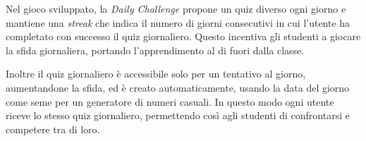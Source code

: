 Nel gioco sviluppato, la \textit{Daily Challenge} propone un quiz diverso ogni giorno e mantiene una \textit{streak} che indica il numero di giorni consecutivi in cui l'utente ha completato con successo il quiz giornaliero.
Questo incentiva gli studenti a giocare la sfida giornaliera, portando l'apprendimento al di fuori dalla classe.

Inoltre il quiz giornaliero è accessibile solo per un tentativo al giorno, aumentandone la sfida, ed è creato automaticamente, usando la data del giorno come seme per un generatore di numeri casuali. In questo modo ogni utente riceve lo stesso quiz giornaliero, permettendo così agli studenti di confrontarsi e competere tra di loro.